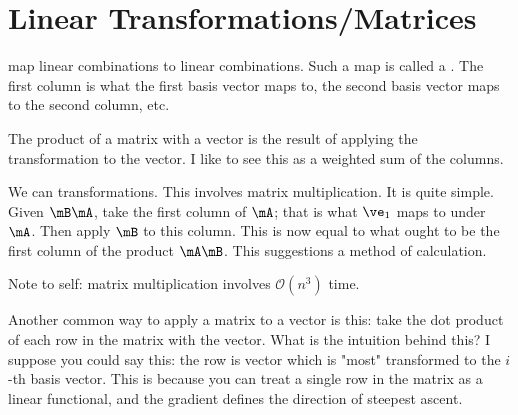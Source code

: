 \section{Linear Transformations/Matrices}

 map linear combinations to linear combinations. Such a
map is called a . The first column is what
the first basis vector maps to, the second basis vector maps to the
second column, etc.

The product of a matrix with a vector is the result of applying the
transformation to the vector. I like to see this as a weighted sum of
the columns.

We can  transformations. This involves matrix
multiplication. It is quite simple. Given $\mB\mA$, take the first
column of $\mA$; that is what $\ve_1$ maps to under $\mA$. Then apply
$\mB$ to this column. This is now equal to what ought to be the first
column of the product $\mA\mB$. This suggestions a method of
calculation.

Note to self: matrix multiplication involves $\mathcal{O}(n^3)$ time.

Another common way to apply a matrix to a vector is this: take the dot
product of each row in the matrix with the vector. What is the intuition
behind this? I suppose you could say this: the row is vector which is
"most" transformed to the $i$-th basis vector. This is because you can
treat a single row in the matrix as a linear functional, and the
gradient defines the direction of steepest ascent.
